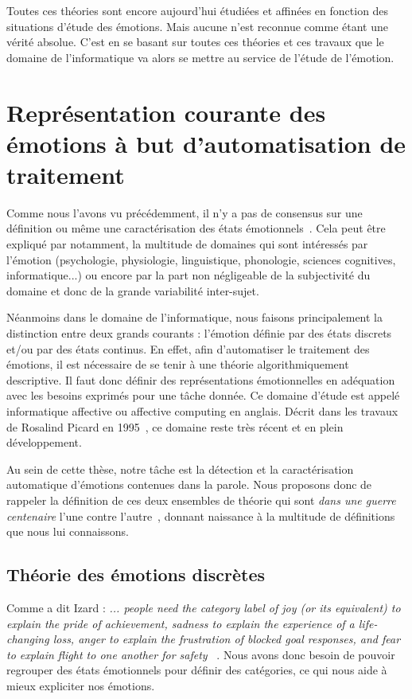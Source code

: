 Toutes ces théories sont encore aujourd'hui étudiées et affinées en fonction des situations d'étude des émotions. Mais aucune n'est reconnue comme étant une vérité absolue. C'est en se basant sur toutes ces théories et ces travaux que le domaine de l'informatique va alors se mettre au service de l'étude de l'émotion.


\section{Représentation courante des émotions à but d'automatisation de traitement}
Comme nous l'avons vu précédemment, il n'y a pas de consensus sur une définition ou même une caractérisation des états émotionnels~\cite{Kleinginna1981}. Cela peut être expliqué par notamment, la multitude de domaines qui sont intéressés par l'émotion (psychologie, physiologie, linguistique, phonologie, sciences cognitives, informatique...) ou encore par la part non négligeable de la subjectivité du domaine et donc de la grande variabilité inter-sujet.

Néanmoins dans le domaine de l'informatique, nous faisons principalement la distinction entre deux grands courants : l'émotion définie par des états discrets et/ou par des états continus. En effet, afin d'automatiser le traitement des émotions, il est nécessaire de se tenir à une théorie algorithmiquement descriptive. Il faut donc définir des représentations émotionnelles en adéquation avec les besoins exprimés pour une tâche donnée. Ce domaine d'étude est appelé informatique affective ou affective computing en anglais. Décrit dans les travaux de Rosalind Picard en 1995~\cite{Picard2000}, ce domaine reste très récent et en plein développement.

Au sein de cette thèse, notre tâche est la détection et la caractérisation automatique d'émotions contenues dans la parole. Nous proposons donc de rappeler la définition de ces deux ensembles de théorie qui sont \textit{dans une guerre centenaire} l'une contre l'autre~\cite{Lindquist2013}, donnant naissance à la multitude de définitions que nous lui connaissons.

\subsection{Théorie des émotions discrètes}
Comme a dit Izard : \textit{... people need the category label of joy (or its equivalent) to explain the pride of achievement, sadness to explain the experience of a life-changing loss, anger to explain the frustration of blocked goal responses, and fear to explain flight to one another for safety}
~\cite{Izard2007}. Nous avons donc besoin de pouvoir regrouper des états émotionnels pour définir des catégories, ce qui nous aide à mieux expliciter nos émotions.

